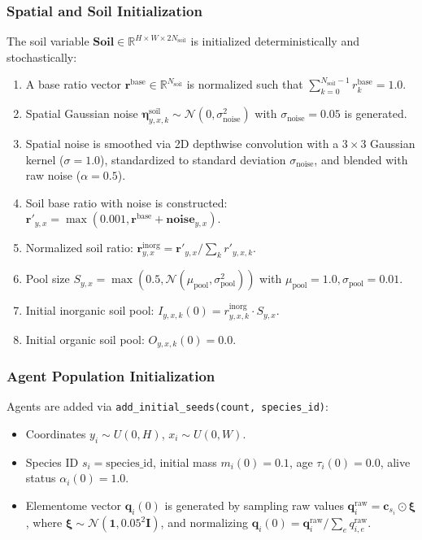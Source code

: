 \documentclass[11pt,a4paper]{article}
\begin{document}
\subsubsection{Spatial and Soil Initialization}
The soil variable $\mathbf{Soil} \in \mathbb{R}^{H \times W \times 2 N_{\text{soil}}}$ is initialized deterministically and stochastically:
\begin{enumerate}
    \item A base ratio vector $\boldsymbol{r}^{\text{base}} \in \mathbb{R}^{N_{\text{soil}}}$ is normalized such that $\sum_{k=0}^{N_{\text{soil}}-1} r^{\text{base}}_k = 1.0$.
    \item Spatial Gaussian noise $\boldsymbol{\eta}^{\text{soil}}_{y,x,k} \sim \mathcal{N}(0, \sigma_{\text{noise}}^2)$ with $\sigma_{\text{noise}} = 0.05$ is generated.
    \item Spatial noise is smoothed via 2D depthwise convolution with a $3 \times 3$ Gaussian kernel ($\sigma=1.0$), standardized to standard deviation $\sigma_{\text{noise}}$, and blended with raw noise ($\alpha=0.5$).
    \item Soil base ratio with noise is constructed: $\boldsymbol{r}'_{y,x} = \max(0.001, \boldsymbol{r}^{\text{base}} + \mathbf{noise}_{y,x})$.
    \item Normalized soil ratio: $\boldsymbol{r}^{\text{inorg}}_{y,x} = \boldsymbol{r}'_{y,x} / \sum_{k} r'_{y,x,k}$.
    \item Pool size $S_{y,x} = \max(0.5, \mathcal{N}(\mu_{\text{pool}}, \sigma_{\text{pool}}^2))$ with $\mu_{\text{pool}}=1.0, \sigma_{\text{pool}}=0.01$.
    \item Initial inorganic soil pool: $I_{y,x,k}(0) = r^{\text{inorg}}_{y,x,k} \cdot S_{y,x}$.
    \item Initial organic soil pool: $O_{y,x,k}(0) = 0.0$.
\end{enumerate}

\subsubsection{Agent Population Initialization}
Agents are added via \texttt{add\_initial\_seeds(count, species\_id)}:
\begin{itemize}
    \item Coordinates $y_i \sim U(0, H)$, $x_i \sim U(0, W)$.
    \item Species ID $s_i = \text{species\_id}$, initial mass $m_i(0) = 0.1$, age $\tau_i(0) = 0.0$, alive status $\alpha_i(0) = 1.0$.
    \item Elementome vector $\boldsymbol{q}_i(0)$ is generated by sampling raw values $\boldsymbol{q}^{\text{raw}}_i = \boldsymbol{c}_{s_i} \odot \boldsymbol{\xi}$, where $\boldsymbol{\xi} \sim \mathcal{N}(\boldsymbol{1}, 0.05^2 \mathbf{I})$, and normalizing $\boldsymbol{q}_i(0) = \boldsymbol{q}^{\text{raw}}_i / \sum_e q^{\text{raw}}_{i,e}$.
\end{itemize}
\end{document}
